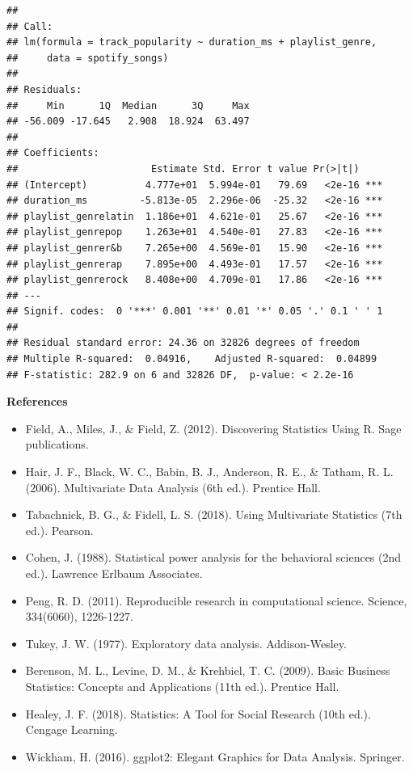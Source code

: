 \documentclass[
  b5paper]{book}
\providecommand{\tightlist}{%
  \setlength{\itemsep}{0pt}\setlength{\parskip}{0pt}}
\begin{document}
\begin{verbatim}
## 
## Call:
## lm(formula = track_popularity ~ duration_ms + playlist_genre, 
##     data = spotify_songs)
## 
## Residuals:
##     Min      1Q  Median      3Q     Max 
## -56.009 -17.645   2.908  18.924  63.497 
## 
## Coefficients:
##                       Estimate Std. Error t value Pr(>|t|)    
## (Intercept)          4.777e+01  5.994e-01   79.69   <2e-16 ***
## duration_ms         -5.813e-05  2.296e-06  -25.32   <2e-16 ***
## playlist_genrelatin  1.186e+01  4.621e-01   25.67   <2e-16 ***
## playlist_genrepop    1.263e+01  4.540e-01   27.83   <2e-16 ***
## playlist_genrer&b    7.265e+00  4.569e-01   15.90   <2e-16 ***
## playlist_genrerap    7.895e+00  4.493e-01   17.57   <2e-16 ***
## playlist_genrerock   8.408e+00  4.709e-01   17.86   <2e-16 ***
## ---
## Signif. codes:  0 '***' 0.001 '**' 0.01 '*' 0.05 '.' 0.1 ' ' 1
## 
## Residual standard error: 24.36 on 32826 degrees of freedom
## Multiple R-squared:  0.04916,    Adjusted R-squared:  0.04899 
## F-statistic: 282.9 on 6 and 32826 DF,  p-value: < 2.2e-16
\end{verbatim}

\textbf{References}

\begin{itemize}
\tightlist
\item
  Field, A., Miles, J., \& Field, Z. (2012). Discovering Statistics Using R. Sage publications.
\item
  Hair, J. F., Black, W. C., Babin, B. J., Anderson, R. E., \& Tatham, R. L. (2006). Multivariate Data Analysis (6th ed.). Prentice Hall.
\item
  Tabachnick, B. G., \& Fidell, L. S. (2018). Using Multivariate Statistics (7th ed.). Pearson.
\item
  Cohen, J. (1988). Statistical power analysis for the behavioral sciences (2nd ed.). Lawrence Erlbaum Associates.
\item
  Peng, R. D. (2011). Reproducible research in computational science. Science, 334(6060), 1226-1227.
\item
  Tukey, J. W. (1977). Exploratory data analysis. Addison-Wesley.
\item
  Berenson, M. L., Levine, D. M., \& Krehbiel, T. C. (2009). Basic Business Statistics: Concepts and Applications (11th ed.). Prentice Hall.
\item
  Healey, J. F. (2018). Statistics: A Tool for Social Research (10th ed.). Cengage Learning.
\item
  Wickham, H. (2016). ggplot2: Elegant Graphics for Data Analysis. Springer.
\end{itemize}
\end{document}
